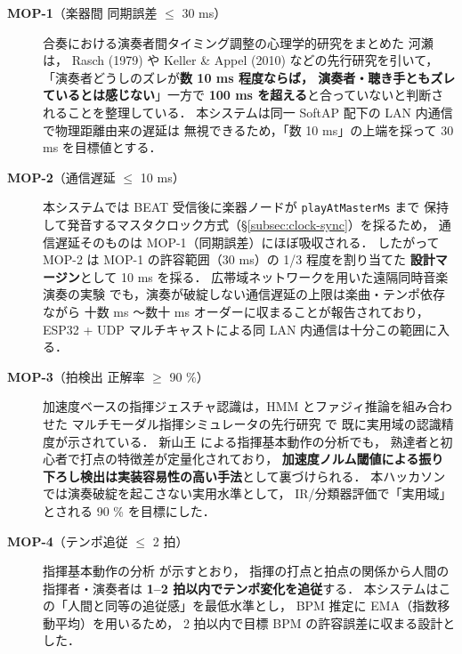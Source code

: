 \documentclass[lualatex,book,paper=a4paper,jafontsize=11.5pt,jafontscale=1.05]{jlreq}
\begin{document}
\begin{description}
  \item[\textmd{\textbf{MOP-1}}（楽器間 同期誤差 $\leq$ 30 ms）]
        合奏における演奏者間タイミング調整の心理学的研究をまとめた
        河瀬 \cite{kawase2014ensemble} は，
        Rasch (1979) や Keller \& Appel (2010) などの先行研究を引いて，
        「演奏者どうしのズレが\textbf{数 10 ms 程度ならば，
        演奏者・聴き手ともズレているとは感じない}」一方で
        \textbf{100 ms を超える}と合っていないと判断されることを整理している．
        本システムは同一 SoftAP 配下の LAN 内通信で物理距離由来の遅延は
        無視できるため，「数 10 ms」の上端を採って 30 ms を目標値とする．

  \item[\textmd{\textbf{MOP-2}}（通信遅延 $\leq$ 10 ms）]
        本システムでは BEAT 受信後に楽器ノードが \texttt{playAtMasterMs} まで
        保持して発音するマスタクロック方式（\S\ref{subsec:clock-sync}）を採るため，
        通信遅延そのものは MOP-1（同期誤差）にほぼ吸収される．
        したがって MOP-2 は MOP-1 の許容範囲（30 ms）の 1/3 程度を割り当てた
        \textbf{設計マージン}として 10 ms を採る．
        広帯域ネットワークを用いた遠隔同時音楽演奏の実験 \cite{ipsj_remote}
        でも，演奏が破綻しない通信遅延の上限は楽曲・テンポ依存ながら
        十数 ms 〜数十 ms オーダーに収まることが報告されており，
        ESP32 + UDP マルチキャストによる同 LAN 内通信は十分この範囲に入る．

  \item[\textmd{\textbf{MOP-3}}（拍検出 正解率 $\geq$ 90 \%）]
        加速度ベースの指揮ジェスチャ認識は，HMM とファジィ推論を組み合わせた
        マルチモーダル指揮シミュレータの先行研究 \cite{usa1998conductor} で
        既に実用域の認識精度が示されている．
        新山王 \cite{shinyamao2004conductor} による指揮基本動作の分析でも，
        熟達者と初心者で打点の特徴差が定量化されており，
        \textbf{加速度ノルム閾値による振り下ろし検出は実装容易性の高い手法}として裏づけられる．
        本ハッカソンでは演奏破綻を起こさない実用水準として，
        IR/分類器評価で「実用域」とされる 90 \% を目標にした．

  \item[\textmd{\textbf{MOP-4}}（テンポ追従 $\leq$ 2 拍）]
        指揮基本動作の分析 \cite{shinyamao2004conductor} が示すとおり，
        指揮の打点と拍点の関係から人間の指揮者・演奏者は
        \textbf{1--2 拍以内でテンポ変化を追従}する．
        本システムはこの「人間と同等の追従感」を最低水準とし，
        BPM 推定に EMA（指数移動平均）を用いるため，
        2 拍以内で目標 BPM の許容誤差に収まる設計とした．


\end{description}
\end{document}
